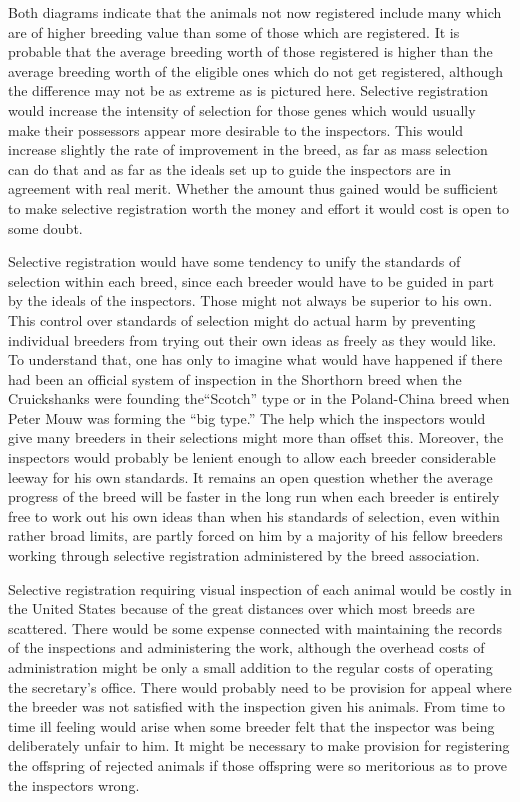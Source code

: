Both diagrams indicate that the animals not now registered include
many which are of higher breeding value than some of those which are
registered. It is probable that the average breeding worth of those registered
is higher than the average breeding worth of the eligible ones
which do not get registered, although the difference may not be as
extreme as is pictured here. Selective registration would increase the
intensity of selection for those genes which would usually make their
possessors appear more desirable to the inspectors. This would increase
slightly the rate of improvement in the breed, as far as mass selection
can do that and as far as the ideals set up to guide the inspectors are in
agreement with real merit. Whether the amount thus gained would be
sufficient to make selective registration worth the money and effort it
would cost is open to some doubt.

Selective registration would have some tendency to unify the standards
of selection within each breed, since each breeder would have to
be guided in part by the ideals of the inspectors. Those might not
always be superior to his own. This control over standards of selection
might do actual harm by preventing individual breeders from trying
out their own ideas as freely as they would like. To understand that,
one has only to imagine what would have happened if there had been
an official system of inspection in the Shorthorn breed when the Cruickshanks
were founding the``Scotch'' type or in the Poland-China breed
when Peter Mouw was forming the ``big type.'' The help which the
inspectors would give many breeders in their selections might more
than offset this. Moreover, the inspectors would probably be lenient
enough to allow each breeder considerable leeway for his own standards.
It remains an open question whether the average progress of the
breed will be faster in the long run when each breeder is entirely free
to work out his own ideas than when his standards of selection, even
within rather broad limits, are partly forced on him by a majority of his
fellow breeders working through selective registration administered by
the breed association.

Selective registration requiring visual inspection of each animal
would be costly in the United States because of the great distances
over which most breeds are scattered. There would be some expense
connected with maintaining the records of the inspections and administering
the work, although the overhead costs of administration might be
only a small addition to the regular costs of operating the secretary's
office. There would probably need to be provision for appeal where
the breeder was not satisfied with the inspection given his animals.
From time to time ill feeling would arise when some breeder felt that
the inspector was being deliberately unfair to him. It might be necessary
to make provision for registering the offspring of rejected animals
if those offspring were so meritorious as to prove the inspectors wrong.

